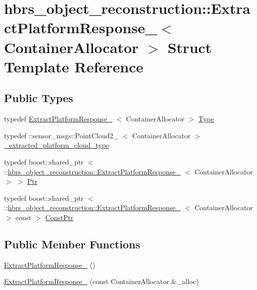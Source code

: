 \hypertarget{structhbrs__object__reconstruction_1_1_extract_platform_response__}{\section{hbrs\-\_\-object\-\_\-reconstruction\-:\-:\-Extract\-Platform\-Response\-\_\-$<$ \-Container\-Allocator $>$ \-Struct \-Template \-Reference}
\label{structhbrs__object__reconstruction_1_1_extract_platform_response__}
}
\subsection*{\-Public \-Types}
\begin{DoxyCompactItemize}
\item 
typedef \*
\hyperlink{structhbrs__object__reconstruction_1_1_extract_platform_response__}{\-Extract\-Platform\-Response\-\_\-}\*
$<$ \-Container\-Allocator $>$ \hyperlink{structhbrs__object__reconstruction_1_1_extract_platform_response___ad2f838a0a79227571b37da7f928e6b89}{\-Type}
\item 
typedef \*
\-::sensor\-\_\-msgs\-::\-Point\-Cloud2\-\_\-\*
$<$ \-Container\-Allocator $>$ \hyperlink{structhbrs__object__reconstruction_1_1_extract_platform_response___a56a71ac31222bb75042448fdcaaf0e9a}{\-\_\-extracted\-\_\-platform\-\_\-cloud\-\_\-type}
\item 
typedef boost\-::shared\-\_\-ptr\*
$<$ \-::\hyperlink{structhbrs__object__reconstruction_1_1_extract_platform_response__}{hbrs\-\_\-object\-\_\-reconstruction\-::\-Extract\-Platform\-Response\-\_\-}\*
$<$ \-Container\-Allocator $>$ $>$ \hyperlink{structhbrs__object__reconstruction_1_1_extract_platform_response___af524f2e96f128cfbdf12eeb5337a01d1}{\-Ptr}
\item 
typedef boost\-::shared\-\_\-ptr\*
$<$ \-::\hyperlink{structhbrs__object__reconstruction_1_1_extract_platform_response__}{hbrs\-\_\-object\-\_\-reconstruction\-::\-Extract\-Platform\-Response\-\_\-}\*
$<$ \-Container\-Allocator $>$ const  $>$ \hyperlink{structhbrs__object__reconstruction_1_1_extract_platform_response___a8f2d74204a95c1817d4e69f026590159}{\-Const\-Ptr}
\end{DoxyCompactItemize}
\subsection*{\-Public \-Member \-Functions}
\begin{DoxyCompactItemize}
\item 
\hyperlink{structhbrs__object__reconstruction_1_1_extract_platform_response___a4967e5c013bcb81e513600424bc59011}{\-Extract\-Platform\-Response\-\_\-} ()
\item 
\hyperlink{structhbrs__object__reconstruction_1_1_extract_platform_response___a5b411175f9e85298b23e9d52f95fd788}{\-Extract\-Platform\-Response\-\_\-} (const \-Container\-Allocator \&\-\_\-alloc)
\end{DoxyCompactItemize}
